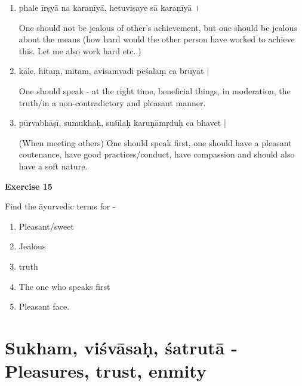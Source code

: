 \begin{enumerate}
\item {}

phale īrṣyā na karaṇīyā, hetuviṣaye sā karaṇīyā । 

One should not be jealous of other’s achievement, but one should be jealous about the means (how hard would the other person have worked to achieve this. Let me also work hard etc..)

\item {}

kāle, hitaṃ, mitam, avisamvadi peśalaṃ ca brūyāt |

One should speak - at the right time, beneficial things, in moderation, the truth/in a non-contradictory and pleasant manner. 

\item {}

pūrvabhāṣī, sumukhaḥ, suśīlaḥ karuṇāmṛduḥ ca bhavet |  

(When meeting others) One should speak first, one should have a pleasant coutenance, have good practices/conduct, have compassion and should also have a soft nature.
\end{enumerate}

\begin{center}
\textbf{\large Exercise 15}
\end{center}

Find the āyurvedic terms for -

\begin{enumerate}
\renewcommand{\theenumi}{\alph{enumi}}
\renewcommand{\labelenumi}{\theenumi.}
\item Pleasant/sweet
\item Jealous
\item truth
\item The one who speaks first
\item Pleasant face.
\end{enumerate}

\chapter{Sukham, viśvāsaḥ, śatrutā - Pleasures, trust, enmity}

